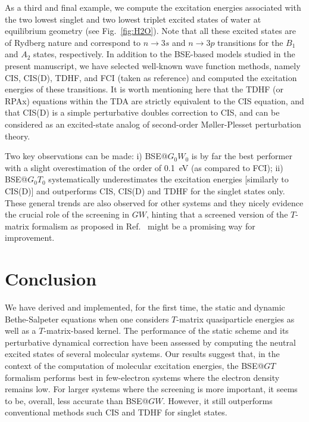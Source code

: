 \documentclass[aip,jcp,reprint,noshowkeys,superscriptaddress]{revtex4-1}
\begin{document}
As a third and final example, we compute the excitation energies associated with the two lowest singlet and two lowest triplet excited states of water at equilibrium geometry (see Fig.~\ref{fig:H2O}).
Note that all these excited states are of Rydberg nature and correspond to $n \to 3s$ and $n \to 3p$ transitions for the $B_1$ and $A_2$ states, respectively. \cite{Loos_2018a}
In addition to the BSE-based models studied in the present manuscript, we have selected well-known wave function methods, \cite{Bene_1971,Head-Gordon_1994,Head-Gordon_1995,Dreuw_2005} namely CIS, CIS(D), TDHF, and FCI (taken as reference) and computed the excitation energies of these transitions.
It is worth mentioning here that the TDHF (or RPAx) equations within the TDA are strictly equivalent to the CIS equation, \cite{Dreuw_2005} and that CIS(D) is a simple perturbative doubles correction to CIS, and can be considered as an excited-state analog of second-order M{\o}ller-Plesset perturbation theory. \cite{Head-Gordon_1994,Head-Gordon_1995}

Two key observations can be made:
i) BSE@$G_0W_0$ is by far the best performer with a slight overestimation of the order of \SI{0.1}{eV} (as compared to FCI);
ii) BSE@$G_0T_0$ systematically underestimates the excitation energies [similarly to CIS(D)] and outperforms CIS, CIS(D) and TDHF for the singlet states only. 
These general trends are also observed for other systems and they nicely evidence the crucial role of the screening in $GW$, hinting that a screened version of the $T$-matrix formalism as proposed in Ref.~ might be a promising way for improvement.

\section{Conclusion}
\label{sec:ccl}
We have derived and implemented, for the first time, the static and dynamic Bethe-Salpeter equations when one considers $T$-matrix quasiparticle energies as well as a $T$-matrix-based kernel.
The performance of the static scheme and its perturbative dynamical correction have been assessed by computing the neutral excited states of several molecular systems.
Our results suggest that, in the context of the computation of molecular excitation energies, the BSE@$GT$ formalism performs best in few-electron systems where the electron density remains low.
For larger systems where the screening is more important, it seems to be, overall, less accurate than BSE@$GW$.
However, it still outperforms conventional methods such CIS and TDHF for singlet states.
\end{document}
